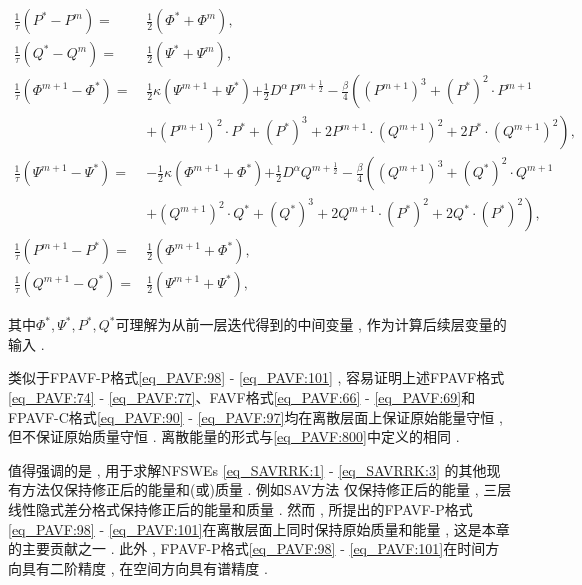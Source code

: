 \begin{enumerate}[$\bullet$]
\begin{align}
\frac{1}{\tau}\left(P^{*}-P^{m}\right)=&\frac{1}{2}(\varPhi^{*}+\varPhi^{m}) , \label{eq_PAVF:92}\\
\frac{1}{\tau}\left(Q^{*}-Q^{m}\right)=&\frac{1}{2}(\Psi^{*}+\Psi^{m}) , \label{eq_PAVF:93}\\
\frac{1}{\tau}\left(\varPhi^{m+1}-\varPhi^{*}\right)=&\frac{1}{2}\kappa (\Psi^{m+1}+\Psi^{*}){+\frac{1}{2}D^{\alpha} P^{m+\frac{1}{2}}}-\frac{\beta}{4}\left((P^{m+1})^3+(P^{*})^{2}\cdot P^{m+1}\right . \nonumber\\
		&\left . +(P^{m+1})^{2}\cdot P^{*}+ (P^{*})^{3}+2 P^{m+1}\cdot (Q^{m+1})^{2}+2 P^{*}\cdot (Q^{m+1})^{2}\right) , \label{eq_PAVF:94}\\
\frac{1}{\tau}\left(\Psi^{m+1}-\Psi^{*}\right)=&-\frac{1}{2}\kappa (\varPhi^{m+1}+\varPhi^{*}){+\frac{1}{2}D^{\alpha} Q^{m+\frac{1}{2}}}-\frac{\beta}{4}\left((Q^{m+1})^3+(Q^{*})^{2}\cdot Q^{m+1}\right . \nonumber\\
		&\left . +(Q^{m+1})^{2}\cdot Q^{*}+ (Q^{*})^{3}+2 Q^{m+1}\cdot (P^{*})^{2}+2 Q^{*}\cdot (P^{*})^{2}\right) , \label{eq_PAVF:95}\\
\frac{1}{\tau}\left(P^{m+1}-P^{*}\right)=&\frac{1}{2}(\varPhi^{m+1}+\varPhi^{*}) , \label{eq_PAVF:96}\\
\frac{1}{\tau}\left(Q^{m+1}-Q^{*}\right)=&\frac{1}{2}(\Psi^{m+1}+\Psi^{*}) , \label{eq_PAVF:97}
\end{align}
\end{enumerate}
其中$\Phi^* , \Psi^* , P^* , Q^*$可理解为从前一层迭代得到的中间变量 , 作为计算后续层变量的输入 . 

\begin{remark}\label{rk_PAVF:1}
类似于FPAVF-P格式\eqref{eq_PAVF:98} - \eqref{eq_PAVF:101} , 容易证明上述FPAVF格式\eqref{eq_PAVF:74} - \eqref{eq_PAVF:77}、FAVF格式\eqref{eq_PAVF:66} - \eqref{eq_PAVF:69}和FPAVF-C格式\eqref{eq_PAVF:90} - \eqref{eq_PAVF:97}均在离散层面上保证原始能量守恒 , 但不保证原始质量守恒 . 离散能量的形式与\eqref{eq_PAVF:800}中定义的相同 . 
\end{remark}

\begin{remark}\label{rk_PAVF:2}
值得强调的是 , 用于求解NFSWEs \eqref{eq_SAVRRK:1} - \eqref{eq_SAVRRK:3} 的其他现有方法仅保持修正后的能量和(或)质量 . 
例如SAV方法 \cite{chengConvergenceEnergyconservingScheme2022}仅保持修正后的能量 , 
三层线性隐式差分格式\cite{ranLinearlyImplicitConservative2016}保持修正后的能量和质量 . 
然而 , 所提出的FPAVF-P格式\eqref{eq_PAVF:98} - \eqref{eq_PAVF:101}在离散层面上同时保持原始质量和能量 , 这是本章的主要贡献之一 . 
此外 , FPAVF-P格式\eqref{eq_PAVF:98} - \eqref{eq_PAVF:101}在时间方向具有二阶精度 , 在空间方向具有谱精度 . 
\end{remark}

